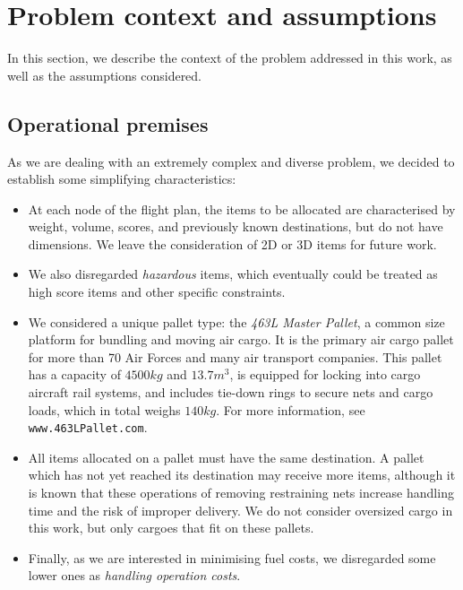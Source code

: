 \documentclass[preprint,authoryear]{elsarticle}
\begin{document}
\section{Problem context and assumptions}
\label{sec3}

In this section, we describe the context of the problem addressed in this work, as well as the assumptions considered.

\subsection{Operational premises}

As we are dealing with an extremely complex and diverse problem, we decided to establish some simplifying characteristics:

\begin{itemize}
	
	\item At each node of the flight plan, the items to be allocated are characterised by weight, volume, scores, and previously known destinations, but do not have dimensions. We leave the consideration of 2D or 3D items for future work.
	
	\item We also disregarded {\it hazardous} items, which eventually could be treated as high score items and other specific constraints.
	
	\item We considered a unique pallet type: the {\it 463L Master Pallet}, a common size platform for bundling and moving air cargo. It is the primary air cargo pallet for more than 70 Air Forces and many air transport companies. This pallet has a capacity of $4500 kg$ and $13.7 m^3$, is equipped for locking into cargo aircraft rail systems, and includes tie-down rings to secure nets and cargo loads, which in total weighs $140 kg$. For more information, see {\tt www.463LPallet.com}.
	
	\item All items allocated on a pallet must have the same destination. A pallet which has not yet reached its destination may receive more items, although it is known that these operations of removing restraining nets increase handling time and the risk of improper delivery. We do not consider oversized cargo in this work, but only cargoes that fit on these pallets.

	\item Finally, as we are interested in minimising fuel costs, we disregarded some lower ones as {\it handling operation costs}.

\end{itemize}
\end{document}
